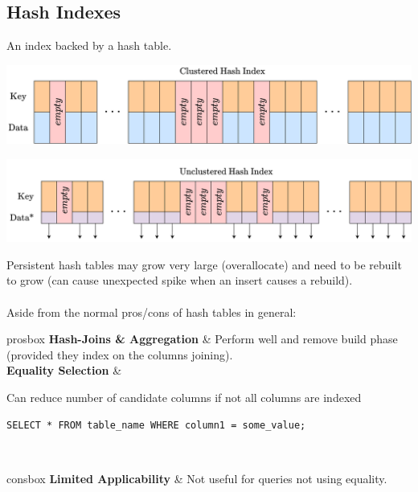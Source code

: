 \subsection{Hash Indexes}
An index backed by a hash table.
\begin{center}
    \includegraphics[width=.8\textwidth]{algorithms_and_indices/images/hash_index_clustered.drawio.png}
\end{center}
\begin{center}
    \includegraphics[width=.8\textwidth]{algorithms_and_indices/images/hash_index_unclustered.drawio.png}
\end{center}
Persistent hash tables may grow very large (overallocate) and need to be rebuilt to grow (can cause unexpected spike when an insert causes a rebuild).
\\
\\ Aside from the normal pros/cons of hash tables in general:
\begin{tabbox}[.7\textwidth]{prosbox}
    \textbf{Hash-Joins \& Aggregation} & Perform well and remove build phase (provided they index on the columns joining). \\
    \textbf{Equality Selection} & {Can reduce number of candidate columns if not all columns are indexed
            \begin{verbatim}
SELECT * FROM table_name WHERE column1 = some_value;
    \end{verbatim}
        } \\
\end{tabbox}

\begin{tabbox}{consbox}
    \textbf{Limited Applicability} & Not useful for queries not using equality. \\
\end{tabbox}

